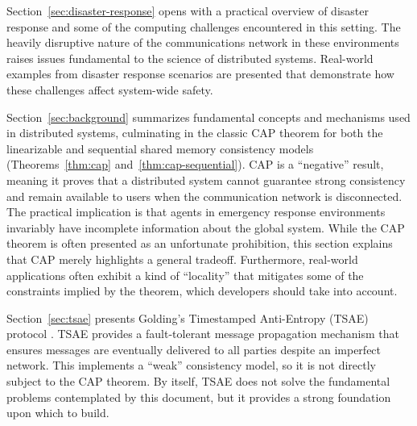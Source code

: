 \documentclass[]             %
{NASA}                       %
\theoremstyle{definition}
\begin{document}
Section~\ref{sec:disaster-response} opens with a practical overview of disaster response and some of the computing challenges encountered in this setting. The heavily disruptive nature of the communications network in these environments raises issues fundamental to the science of distributed systems. Real-world examples from disaster response scenarios are presented that demonstrate how these challenges affect system-wide safety.

Section~\ref{sec:background} summarizes fundamental concepts and mechanisms used in distributed systems, culminating in the classic CAP theorem for both the linearizable and sequential shared memory consistency models (Theorems~\ref{thm:cap} and~\ref{thm:cap-sequential}). CAP is a ``negative'' result, meaning it proves that a distributed system cannot guarantee strong consistency and remain available to users when the communication network is disconnected. The practical implication is that agents in emergency response environments invariably have incomplete information about the global system.  While the CAP theorem is often presented as an unfortunate prohibition, this section explains that CAP merely highlights a general tradeoff. Furthermore, real-world applications often exhibit a kind of ``locality'' that mitigates some of the constraints implied by the theorem, which developers should take into account.

Section~\ref{sec:tsae} presents Golding's Timestamped Anti-Entropy (TSAE) protocol \cite{1992:golding-thesis}. TSAE provides a fault-tolerant message propagation mechanism that ensures messages are eventually delivered to all parties despite an imperfect network. This implements a ``weak'' consistency model, so it is not directly subject to the CAP theorem. By itself, TSAE does not solve the fundamental problems contemplated by this document, but it provides a strong foundation upon which to build.
\end{document}

